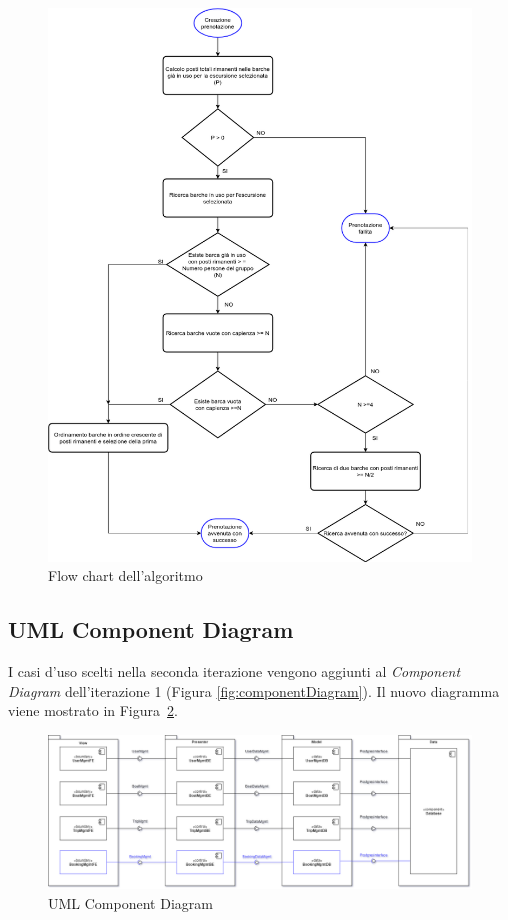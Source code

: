 \begin{figure}[htbp]
    \includegraphics[scale=0.45]{images/iterazione2/flowChart.png}
    \centering
    \caption{Flow chart dell'algoritmo}\label{fig:flowChart}
\end{figure}

\clearpage
\subsection{UML Component Diagram}
I casi d’uso scelti nella seconda iterazione vengono aggiunti al \textit{Component Diagram} dell'iterazione 1 (Figura \ref{fig:componentDiagram}). Il nuovo diagramma viene mostrato in  Figura~\ref{fig:componentDiagram2}.

\begin{figure}[htbp]
    \includegraphics[width=\textwidth]{images/iterazione2/diagrams/ComponentDiagram_v2.png}
    \centering
    \caption{UML Component Diagram}\label{fig:componentDiagram2}
\end{figure}

